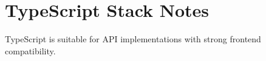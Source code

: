 \section{TypeScript Stack Notes}

TypeScript is suitable for API implementations with strong frontend compatibility.
